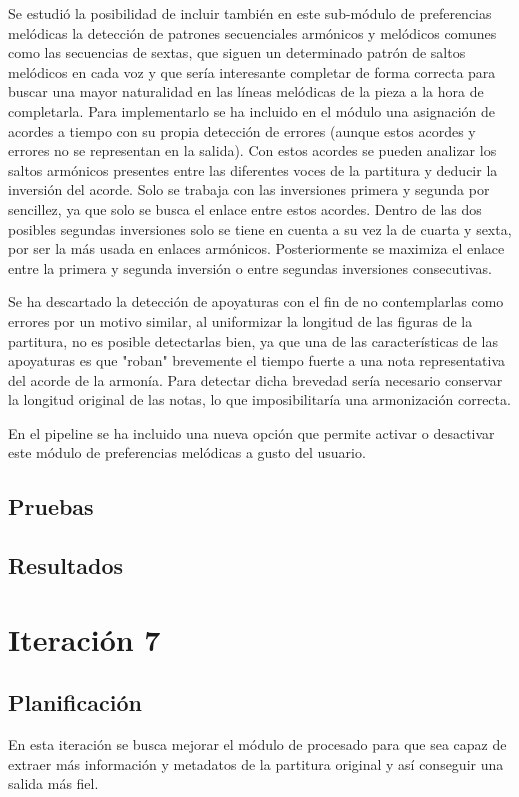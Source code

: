 Se estudió la posibilidad de incluir también en este sub-módulo de preferencias melódicas la detección de patrones secuenciales armónicos y melódicos comunes como las secuencias de sextas, que siguen un determinado patrón de saltos melódicos en cada voz y que sería interesante completar de forma correcta para buscar una mayor naturalidad en las líneas melódicas de la pieza a la hora de completarla. Para implementarlo se ha incluido en el módulo una asignación de acordes a tiempo con su propia detección de errores (aunque estos acordes y errores no se representan en la salida). Con estos acordes se pueden analizar los saltos armónicos presentes entre las diferentes voces de la partitura y deducir la inversión del acorde. Solo se trabaja con las inversiones primera y segunda por sencillez, ya que solo se busca el enlace entre estos acordes. Dentro de las dos posibles segundas inversiones solo se tiene en cuenta a su vez la  de cuarta y sexta, por ser la más usada en enlaces armónicos. Posteriormente se maximiza el enlace entre la primera y segunda inversión o entre segundas inversiones consecutivas.

Se ha descartado la detección de apoyaturas con el fin de no contemplarlas como errores por un motivo similar, al uniformizar la longitud de las figuras de la partitura, no es posible detectarlas bien, ya que una de las características de las apoyaturas es que "roban" brevemente el tiempo fuerte a una nota representativa del acorde de la armonía. Para detectar dicha brevedad sería necesario conservar la longitud original de las notas, lo que imposibilitaría una armonización correcta.

En el pipeline se ha incluido una nueva opción que permite activar o desactivar este módulo de preferencias melódicas a gusto del usuario.

\subsection{Pruebas}

\subsection{Resultados}

\section{Iteración 7}
\subsection{Planificación}
En esta iteración se busca mejorar el módulo de procesado para que sea capaz de extraer más información y metadatos de la partitura original y así conseguir una salida más fiel.

